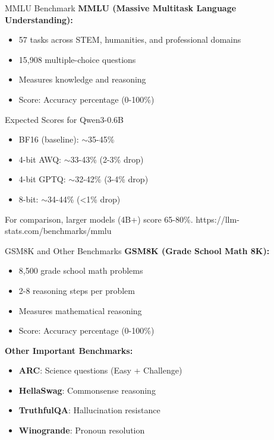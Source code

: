 \documentclass[aspectratio=169,10pt]{beamer}
\begin{document}
\begin{frame}{MMLU Benchmark}
    \textbf{MMLU (Massive Multitask Language Understanding):}
    \begin{itemize}
        \item 57 tasks across STEM, humanities, and professional domains
        \item 15,908 multiple-choice questions
        \item Measures knowledge and reasoning
        \item Score: Accuracy percentage (0-100\%)
    \end{itemize}

    \vspace{0.5cm}
    \begin{block}{Expected Scores for Qwen3-0.6B}
        \begin{itemize}
            \item BF16 (baseline): $\sim$35-45\%
            \item 4-bit AWQ: $\sim$33-43\% (2-3\% drop)
            \item 4-bit GPTQ: $\sim$32-42\% (3-4\% drop)
            \item 8-bit: $\sim$34-44\% (<1\% drop)
        \end{itemize}
    \end{block}

    \vspace{0.3cm}
    {\footnotesize For comparison, larger models (4B+) score 65-80\%.  https://llm-stats.com/benchmarks/mmlu }
\end{frame}

\begin{frame}{GSM8K and Other Benchmarks}
    \textbf{GSM8K (Grade School Math 8K):}
    \begin{itemize}
        \item 8,500 grade school math problems
        \item 2-8 reasoning steps per problem
        \item Measures mathematical reasoning
        \item Score: Accuracy percentage (0-100\%)
    \end{itemize}

    \vspace{0.3cm}
    \textbf{Other Important Benchmarks:}
    \begin{itemize}
        \item \textbf{ARC}: Science questions (Easy + Challenge)
        \item \textbf{HellaSwag}: Commonsense reasoning
        \item \textbf{TruthfulQA}: Hallucination resistance
        \item \textbf{Winogrande}: Pronoun resolution
    \end{itemize}


\end{frame}
\end{document}
